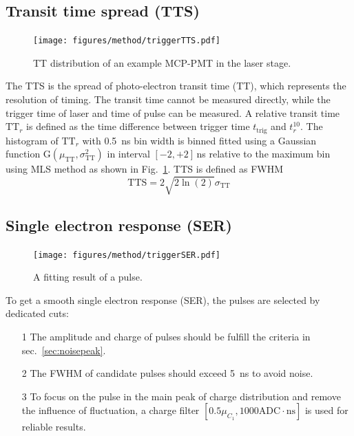 \subsection{Transit time spread (TTS)}
\begin{figure}[!htbp]
    \centering
    \texttt{[image: figures/method/triggerTTS.pdf]}
    \caption{TT distribution of an example MCP-PMT in the laser stage.}
    \label{fig:triggerTTS}
\end{figure}
The TTS is the spread of photo-electron transit time (TT), which represents the resolution of timing. The transit time cannot be measured directly, while the trigger time of laser and time of pulse can be measured. A relative transit time $\mathrm{TT}_r$ is defined as the time difference between trigger time $t_{\mathrm{trig}}$ and $t_r^{10}$. The histogram of $\mathrm{TT}_r$ with \SI{0.5}{ns} bin width is binned fitted using a Gaussian function G$(\mu_{\mathrm{TT}},\sigma_{\mathrm{TT}}^2)$ in interval $[-2,+2]$\,ns relative to the maximum bin using MLS method as shown in Fig.~\ref{fig:triggerTTS}.
TTS is defined as FWHM\cite{HAMAMATSUManual}
\begin{equation}
    \mathrm{TTS}=2\sqrt{2\ln(2)}\sigma_{\mathrm{TT}}
\end{equation}
\subsection{Single electron response (SER)}
\begin{figure}
    \centering
    \texttt{[image: figures/method/triggerSER.pdf]}
    \caption{A fitting result of a pulse.}
    \label{fig:triggerser}
\end{figure}
To get a smooth single electron response (SER), the pulses are selected by dedicated cuts:
\begin{itemize}
    \item[1] The amplitude and charge of pulses should be fulfill the criteria in sec.~\ref{sec:noisepeak}.
    \item[2] The FWHM of candidate pulses should exceed \SI{5}{ns} to avoid noise.
    \item[3] To focus on the pulse in the main peak of charge distribution and remove the influence of fluctuation, a charge filter $[0.5\mu_{C_1}, 1000\mathrm{ADC\cdot ns}]$ is used for reliable results.
\end{itemize}

